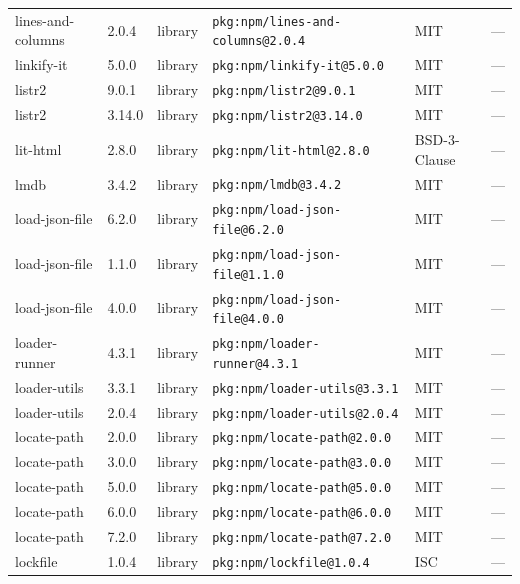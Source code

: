 \documentclass[11pt,a4paper]{article}
\begin{document}
\begin{longtable}{|p{4cm}|p{2cm}|p{1.6cm}|p{5cm}|p{1.5cm}|p{3.5cm}|}
\raggedright lines-and-columns & 2.0.4 & library & \small\texttt{pkg:npm/lines-and-columns@2.0.4} & MIT & \small — \\
\raggedright linkify-it & 5.0.0 & library & \small\texttt{pkg:npm/linkify-it@5.0.0} & MIT & \small — \\
\raggedright listr2 & 9.0.1 & library & \small\texttt{pkg:npm/listr2@9.0.1} & MIT & \small — \\
\raggedright listr2 & 3.14.0 & library & \small\texttt{pkg:npm/listr2@3.14.0} & MIT & \small — \\
\raggedright lit-html & 2.8.0 & library & \small\texttt{pkg:npm/lit-html@2.8.0} & BSD-3-Clause & \small — \\
\raggedright lmdb & 3.4.2 & library & \small\texttt{pkg:npm/lmdb@3.4.2} & MIT & \small — \\
\raggedright load-json-file & 6.2.0 & library & \small\texttt{pkg:npm/load-json-file@6.2.0} & MIT & \small — \\
\raggedright load-json-file & 1.1.0 & library & \small\texttt{pkg:npm/load-json-file@1.1.0} & MIT & \small — \\
\raggedright load-json-file & 4.0.0 & library & \small\texttt{pkg:npm/load-json-file@4.0.0} & MIT & \small — \\
\raggedright loader-runner & 4.3.1 & library & \small\texttt{pkg:npm/loader-runner@4.3.1} & MIT & \small — \\
\raggedright loader-utils & 3.3.1 & library & \small\texttt{pkg:npm/loader-utils@3.3.1} & MIT & \small — \\
\raggedright loader-utils & 2.0.4 & library & \small\texttt{pkg:npm/loader-utils@2.0.4} & MIT & \small — \\
\raggedright locate-path & 2.0.0 & library & \small\texttt{pkg:npm/locate-path@2.0.0} & MIT & \small — \\
\raggedright locate-path & 3.0.0 & library & \small\texttt{pkg:npm/locate-path@3.0.0} & MIT & \small — \\
\raggedright locate-path & 5.0.0 & library & \small\texttt{pkg:npm/locate-path@5.0.0} & MIT & \small — \\
\raggedright locate-path & 6.0.0 & library & \small\texttt{pkg:npm/locate-path@6.0.0} & MIT & \small — \\
\raggedright locate-path & 7.2.0 & library & \small\texttt{pkg:npm/locate-path@7.2.0} & MIT & \small — \\
\raggedright lockfile & 1.0.4 & library & \small\texttt{pkg:npm/lockfile@1.0.4} & ISC & \small — \\

\end{longtable}
\end{document}
